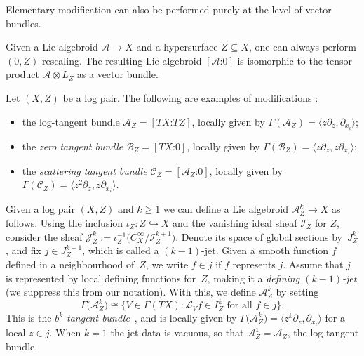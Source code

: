 \documentclass[10pt,a4paper]{amsart}
\numberwithin{equation}{section}
\begin{document}
Elementary modification can also be performed purely at the level of vector bundles.

\begin{Remark}\label{rem:zerorescaling} Given a Lie algebroid $\mathcal{A} \to X$ and a hypersurface $Z \subseteq X$, one can always perform $(0,Z)$-rescaling. The resulting Lie algebroid $[\mathcal{A}\text{:}0]$ is isomorphic to the tensor product $\mathcal{A} \otimes L_Z$ as a vector bundle.
\end{Remark}

\begin{Example} Let $(X,Z)$ be a log pair. The following are examples of modifications \cite{Melrose93,Melrose95}:
	\begin{itemize}\itemsep=0pt
	\item the log-tangent bundle $\mathcal{A}_Z = [TX\text{:}TZ]$, locally given by $\Gamma(\mathcal{A}_Z) = \langle z \partial_z, \partial_{x_i} \rangle$;
	\item the \emph{zero tangent bundle} $\mathcal{B}_Z = [TX\text{:}0]$, locally given by $\Gamma(\mathcal{B}_Z) = \langle z \partial_z, z \partial_{x_i} \rangle$;
	\item the \emph{scattering tangent bundle} $\mathcal{C}_Z = [\mathcal{A}_Z\text{:}0]$, locally given by $\Gamma(\mathcal{C}_Z) = \langle z^2 \partial_z, z \partial_{x_i} \rangle$.
	\end{itemize}
\end{Example}

Given a log pair $(X,Z)$ and $k \geq 1$ we can define a Lie algebroid $\mathcal{A}_Z^k \to X$ as follows. Using the inclusion $\iota_Z\colon Z \hookrightarrow X$ and the vanishing ideal sheaf $\mathcal{I}_Z$ for $Z$, consider the sheaf $\mathcal{J}_Z^k := \iota_Z^{-1}\big(C^\infty_X / \mathcal{I}_Z^{k+1}\big)$. Denote its space of global sections by~$J_Z^k$, and fix $j \in J_Z^{k-1}$, which is called a $(k-1)$-jet. Given a smooth function $f$ defined in a neighbourhood of~$Z$, we write $f \in j$ if $f$ represents $j$. Assume that $j$ is represented by local defining functions for~$Z$, making it a \emph{defining $(k-1)$-jet} (we suppress this from our notation). With this, we define $\mathcal{A}_Z^k$ by setting
\begin{displaymath}
\Gamma\big(\mathcal{A}_Z^k\big) \cong \big\{V \in \Gamma(TX)\colon \mathcal{L}_V f \in I_Z^k \text{ for all } f \in j\big\}.
\end{displaymath}
This is the \emph{$b^k$-tangent bundle}~\cite{Scott16}, and is locally given by $\Gamma\big(\mathcal{A}_Z^k\big) = \big\langle z^k \partial_z, \partial_{x_i} \big\rangle$ for a local $z \in j$. When $k = 1$ the jet data is vacuous, so that $\mathcal{A}_Z^1 = \mathcal{A}_Z$, the log-tangent bundle.
\end{document}
